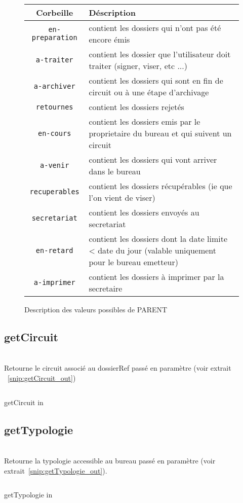 \begin{figure}
\begin{center}
\begin{tabular}{c|p{7cm}}
	\hline
	Corbeille & Déscription \\
	\hline
        \verb|en-preparation| & contient les dossiers qui n'ont pas été encore émis  \\
        \verb|a-traiter| & contient les dossier que l'utilisateur doit traiter (signer, viser, etc ...) \\
        \verb|a-archiver| & contient les dossiers qui sont en fin de circuit ou à une étape d'archivage \\
        \verb|retournes| & contient les dossiers rejetés \\
        \verb|en-cours| & contient les dossiers emis par le proprietaire du bureau et qui suivent un circuit \\
        \verb|a-venir| & contient les dossiers qui vont arriver dans le bureau \\
        \verb|recuperables| & contient les dossiers récupérables (ie que l'on vient de viser) \\
        \verb|secretariat| & contient les dossiers envoyés au secretariat \\
        \verb|en-retard| & contient les dossiers dont la date limite < date du jour (valable uniquement pour le bureau emetteur) \\
        \verb|a-imprimer| & contient les dossiers à imprimer par la secretaire


\end{tabular}
\end{center}
\caption{Description des valeurs possibles de PARENT}
\label{table:parent_values}
\end{figure}


\subsection{getCircuit}
\\


Retourne le circuit associé au dossierRef passé en paramètre (voir extrait ~\ref{snip:getCircuit_out}) 

\begin{codesnippet}
\inputminted[frame=single,linenos,fontsize=\footnotesize]{javascript}{extraits/getCircuit_in.js}
\caption{getCircuit in}
\label{snip:getCircuit_in}
\end{codesnippet}


\subsection{getTypologie}
\\

Retourne la typologie accessible au bureau passé en paramètre (voir extrait~\ref{snip:getTypologie_out}).

\begin{codesnippet}
\inputminted[frame=single,linenos,fontsize=\footnotesize]{javascript}{extraits/getTypologie_in.js}
\caption{getTypologie in}
\label{snip:getTypologie_in}
\end{codesnippet}
